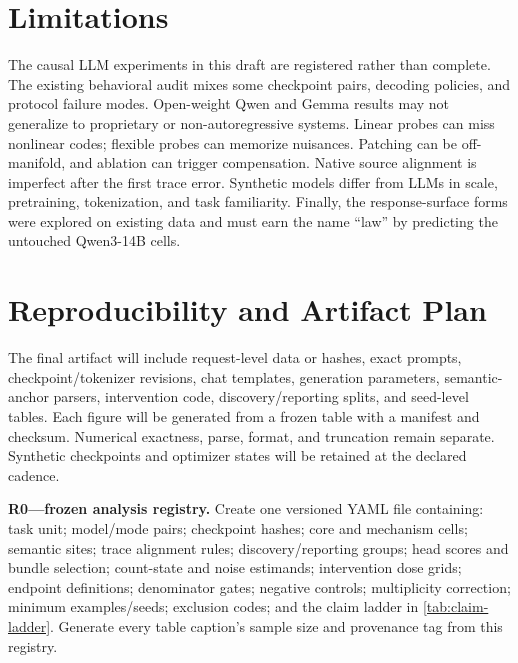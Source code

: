 \section{Limitations}

The causal LLM experiments in this draft are registered rather than complete. The existing behavioral audit mixes some checkpoint pairs, decoding policies, and protocol failure modes. Open-weight Qwen and Gemma results may not generalize to proprietary or non-autoregressive systems. Linear probes can miss nonlinear codes; flexible probes can memorize nuisances. Patching can be off-manifold, and ablation can trigger compensation. Native source alignment is imperfect after the first trace error. Synthetic models differ from LLMs in scale, pretraining, tokenization, and task familiarity. Finally, the response-surface forms were explored on existing data and must earn the name ``law'' by predicting the untouched Qwen3-14B cells.

\section{Reproducibility and Artifact Plan}

The final artifact will include request-level data or hashes, exact prompts, checkpoint/tokenizer revisions, chat templates, generation parameters, semantic-anchor parsers, intervention code, discovery/reporting splits, and seed-level tables. Each figure will be generated from a frozen table with a manifest and checksum. Numerical exactness, parse, format, and truncation remain separate. Synthetic checkpoints and optimizer states will be retained at the declared cadence.

\begin{todobox}
\textbf{R0---frozen analysis registry.}
Create one versioned YAML file containing: task unit; model/mode pairs; checkpoint hashes; core and mechanism cells; semantic sites; trace alignment rules; discovery/reporting groups; head scores and bundle selection; count-state and noise estimands; intervention dose grids; endpoint definitions; denominator gates; negative controls; multiplicity correction; minimum examples/seeds; exclusion codes; and the claim ladder in \cref{tab:claim-ladder}. Generate every table caption's sample size and provenance tag from this registry.
\end{todobox}
